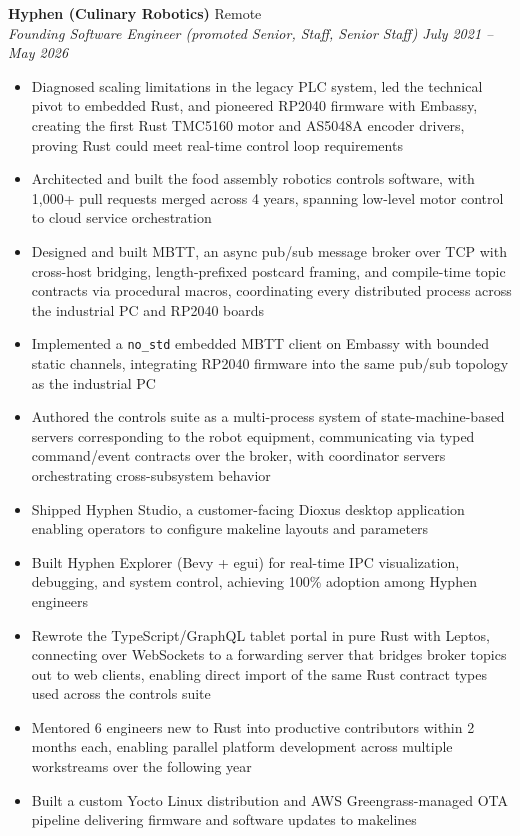 \documentclass[11pt,letterpaper]{article}
\newcommand{\jobentry}[4]{%
  \needspace{5\baselineskip}%
  \vspace{4pt}%
  \textbf{#1} \hfill #2 \\
  \textit{#3} \hfill \textit{#4}%
  \vspace{-4pt}%
  \nopagebreak[4]%
}
\begin{document}
\jobentry{Hyphen (Culinary Robotics)}{Remote}{Founding Software Engineer (promoted Senior, Staff, Senior Staff)}{July 2021 -- May 2026}
\begin{itemize}
  \item Diagnosed scaling limitations in the legacy PLC system, led the technical pivot to embedded Rust, and pioneered RP2040 firmware with Embassy, creating the first Rust TMC5160 motor and AS5048A encoder drivers, proving Rust could meet real-time control loop requirements
  \item Architected and built the food assembly robotics controls software, with 1,000+ pull requests merged across 4 years, spanning low-level motor control to cloud service orchestration
  \item Designed and built MBTT, an async pub/sub message broker over TCP with cross-host bridging, length-prefixed postcard framing, and compile-time topic contracts via procedural macros, coordinating every distributed process across the industrial PC and RP2040 boards
  \item Implemented a \texttt{no\_std} embedded MBTT client on Embassy with bounded static channels, integrating RP2040 firmware into the same pub/sub topology as the industrial PC
  \item Authored the controls suite as a multi-process system of state-machine-based servers corresponding to the robot equipment, communicating via typed command/event contracts over the broker, with coordinator servers orchestrating cross-subsystem behavior
  \item Shipped Hyphen Studio, a customer-facing Dioxus desktop application enabling operators to configure makeline layouts and parameters
  \item Built Hyphen Explorer (Bevy + egui) for real-time IPC visualization, debugging, and system control, achieving 100\% adoption among Hyphen engineers
  \item Rewrote the TypeScript/GraphQL tablet portal in pure Rust with Leptos, connecting over WebSockets to a forwarding server that bridges broker topics out to web clients, enabling direct import of the same Rust contract types used across the controls suite
  \item Mentored 6 engineers new to Rust into productive contributors within 2 months each, enabling parallel platform development across multiple workstreams over the following year
  \item Built a custom Yocto Linux distribution and AWS Greengrass-managed OTA pipeline delivering firmware and software updates to makelines
\end{itemize}
\end{document}

